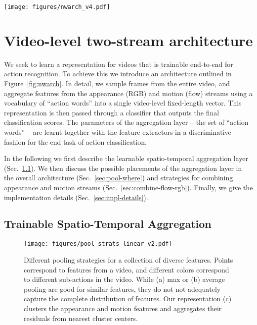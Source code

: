 \documentclass[10pt,twocolumn,letterpaper]{article}
\newcommand{\methodTag}[0]{ActionVLAD}
\begin{document}
 

\begin{figure*}[t]
    \centering
    \texttt{[image: figures/nwarch\_v4.pdf]}
        \caption{Our network architecture.
    We use a standard CNN architecture (VGG-16)
    to extract features from sampled appearance and motion frames from the video. These
    features are then pooled across space
    and time using the \methodTag{} pooling
    layer, which is trainable end to end with a 
    classification loss. We also experiment with
    \methodTag{} to fuse the two streams (Sec.~\ref{sec:combine-flow-rgb}).}
    \label{fig:nwarch}
\end{figure*}

\section{Video-level two-stream architecture}

We seek to learn a representation for videos that
is trainable end-to-end for action recognition. 
To achieve this we introduce an architecture outlined in Figure~\ref{fig:nwarch}.
In detail, we sample frames from the entire video, and aggregate features from the appearance (RGB)
and motion (flow) streams 
using a vocabulary of ``action words'' into a single video-level fixed-length vector. This representation is then passed through a classifier that outputs the final classification scores. The parameters of the aggregation layer -- the set of ``action words'' -- are learnt together with the feature extractors in a discriminative fashion for the end task of action classification.  




In the following we first describe the learnable spatio-temporal aggregation layer (Sec.~\ref{sec:pool-time}). We then discuss the possible placements of the aggregation layer in the overall architecture (Sec.~\ref{sec:pool-where}) and strategies for combining appearance and motion streams (Sec.~\ref{sec:combine-flow-rgb}).
Finally, we give the implementation details (Sec.~\ref{sec:impl-details}).






\subsection{Trainable Spatio-Temporal Aggregation}\label{sec:pool-time}


\begin{figure}[t]
    \centering
    \texttt{[image: figures/pool\_strats\_linear\_v2.pdf]}
        \caption{Different pooling strategies for a collection of diverse
    features. 
    Points correspond to features from a video, and 
    different colors correspond to different sub-actions in the video. 
    While (a) max or (b) average pooling are good for similar features,
    they do not not adequately capture the complete distribution of features.
    Our representation (c) clusters the 
    appearance and motion features and aggregates their residuals from nearest cluster centers.}
    \label{fig:pooling-strats}
\end{figure}
\end{document}
